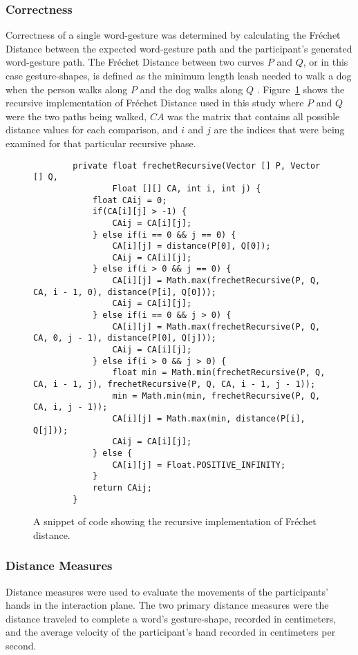 \subsubsection{Correctness} \label{pilot_correctness}
Correctness of a single word-gesture was determined by calculating the Fr\'echet Distance between the expected word-gesture path and the participant's generated word-gesture path. The Fr\'echet Distance between two curves $P$ and $Q$, or in this case gesture-shapes, is defined as the minimum length leash needed to walk a dog when the person walks along $P$ and the dog walks along $Q$ \cite{ref_frechet}. Figure~\ref{code_frechet} shows the recursive implementation of Fr\'echet Distance used in this study where $P$ and $Q$ were the two paths being walked, $CA$ was the matrix that contains all possible distance values for each comparison, and $i$ and $j$ are the indices that were being examined for that particular recursive phase.

\begin{figure}[h] %
	\centering
	\begin{lstlisting}
        private float frechetRecursive(Vector [] P, Vector [] Q,
		        Float [][] CA, int i, int j) {
	        float CAij = 0;
	        if(CA[i][j] > -1) {
		        CAij = CA[i][j];
	        } else if(i == 0 && j == 0) {
		        CA[i][j] = distance(P[0], Q[0]);
		        CAij = CA[i][j];
	        } else if(i > 0 && j == 0) {
		        CA[i][j] = Math.max(frechetRecursive(P, Q, CA, i - 1, 0), distance(P[i], Q[0]));
		        CAij = CA[i][j];
	        } else if(i == 0 && j > 0) {
		        CA[i][j] = Math.max(frechetRecursive(P, Q, CA, 0, j - 1), distance(P[0], Q[j]));
		        CAij = CA[i][j];
	        } else if(i > 0 && j > 0) {
		        float min = Math.min(frechetRecursive(P, Q, CA, i - 1, j), frechetRecursive(P, Q, CA, i - 1, j - 1));
		        min = Math.min(min, frechetRecursive(P, Q, CA, i, j - 1));
		        CA[i][j] = Math.max(min, distance(P[i], Q[j]));
		        CAij = CA[i][j];
	        } else {
		        CA[i][j] = Float.POSITIVE_INFINITY;
	        }
	        return CAij;
        }
	\end{lstlisting}
	\caption[Fr\'echet Distance code snippet]{A snippet of code showing the recursive implementation of Fr\'echet distance.}
	\label{code_frechet}
\end{figure}  

\subsubsection{Distance Measures}
Distance measures were used to evaluate the movements of the participants' hands in the interaction plane. The two primary distance measures were the distance traveled to complete a word's gesture-shape, recorded in centimeters, and the average velocity of the participant's hand recorded in centimeters per second.

